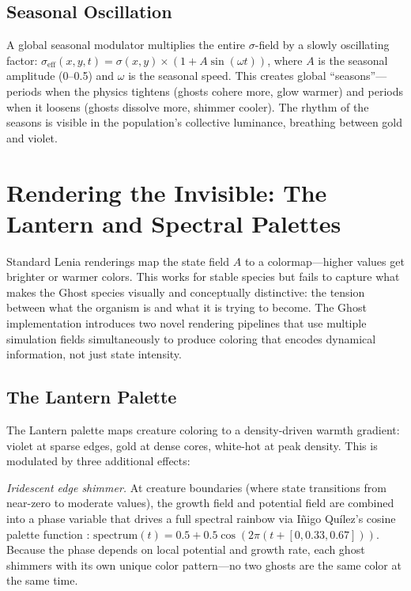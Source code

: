 \documentclass[11pt,a4paper]{article}
\begin{document}
\subsection{Seasonal Oscillation}

A global seasonal modulator multiplies the entire $\sigma$-field by a
slowly oscillating factor:
$\sigma_{\text{eff}}(x,y,t) = \sigma(x,y) \times (1 + A\sin(\omega t))$,
where $A$ is the seasonal amplitude (0--0.5) and $\omega$ is the seasonal
speed. This creates global ``seasons''---periods when the physics tightens
(ghosts cohere more, glow warmer) and periods when it loosens (ghosts
dissolve more, shimmer cooler). The rhythm of the seasons is visible in the
population's collective luminance, breathing between gold and violet.

\section{Rendering the Invisible: The Lantern and Spectral Palettes}

Standard Lenia renderings map the state field $A$ to a colormap---higher
values get brighter or warmer colors. This works for stable species but
fails to capture what makes the Ghost species visually and conceptually
distinctive: the tension between what the organism is and what it is trying
to become. The Ghost implementation introduces two novel rendering
pipelines that use multiple simulation fields simultaneously to produce
coloring that encodes dynamical information, not just state intensity.

\subsection{The Lantern Palette}

The Lantern palette maps creature coloring to a density-driven warmth
gradient: violet at sparse edges, gold at dense cores, white-hot at peak
density. This is modulated by three additional effects:

\textit{Iridescent edge shimmer.} At creature boundaries (where state
transitions from near-zero to moderate values), the growth field and
potential field are combined into a phase variable that drives a full
spectral rainbow via Iñigo Quílez's cosine palette function
\citep{quilez2013}: $\mathrm{spectrum}(t) = 0.5 + 0.5\cos(2\pi(t + [0, 0.33,
0.67]))$. Because the phase depends on local potential and growth rate,
each ghost shimmers with its own unique color pattern---no two ghosts are
the same color at the same time.
\end{document}
